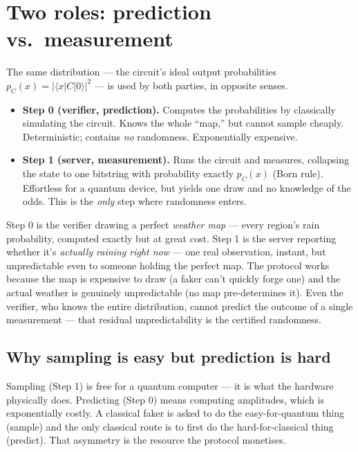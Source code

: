 \documentclass[11pt]{article}
\theoremstyle{definition}
\theoremstyle{plain}
\begin{document}
\section{Two roles: prediction vs.\ measurement}
The same distribution --- the circuit's ideal output probabilities
$p_C(x)=|\langle x|C|0\rangle|^2$ --- is used by both parties, in opposite senses.
\begin{itemize}[leftmargin=1.6em,itemsep=1pt]
\item \textbf{Step 0 (verifier, prediction).} Computes the probabilities by classically
simulating the circuit. Knows the whole ``map,'' but cannot sample cheaply. Deterministic;
contains \emph{no} randomness. Exponentially expensive.
\item \textbf{Step 1 (server, measurement).} Runs the circuit and measures, collapsing the
state to one bitstring with probability exactly $p_C(x)$ (Born rule). Effortless for a
quantum device, but yields one draw and no knowledge of the odds. This is the \emph{only}
step where randomness enters.
\end{itemize}

\begin{plain}
Step 0 is the verifier drawing a perfect \emph{weather map} --- every region's rain
probability, computed exactly but at great cost. Step 1 is the server reporting whether
it's \emph{actually raining right now} --- one real observation, instant, but unpredictable
even to someone holding the perfect map. The protocol works because the map is expensive
to draw (a faker can't quickly forge one) and the actual weather is genuinely
unpredictable (no map pre-determines it). Even the verifier, who knows the entire
distribution, cannot predict the outcome of a single measurement --- that residual
unpredictability is the certified randomness.
\end{plain}

\subsection{Why sampling is easy but prediction is hard}
Sampling (Step 1) is free for a quantum computer --- it is what the hardware physically
does. Predicting (Step 0) means computing amplitudes, which is exponentially costly. A
classical faker is asked to do the easy-for-quantum thing (sample) and the only classical
route is to first do the hard-for-classical thing (predict). That asymmetry is the resource
the protocol monetises.
\end{document}

